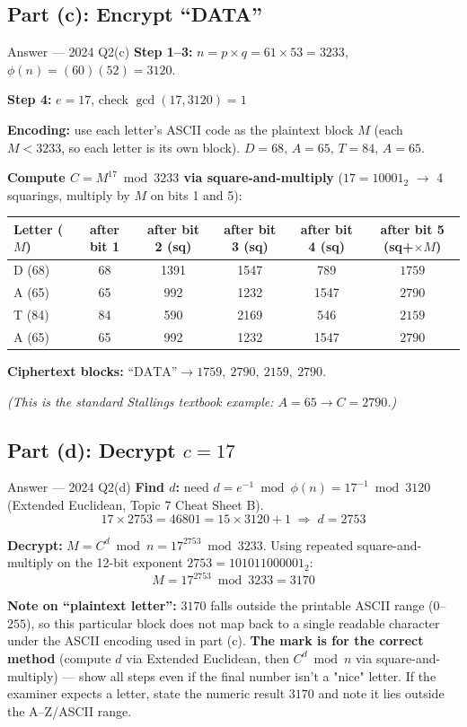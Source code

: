 \documentclass[12pt,a4paper]{article}
\begin{document}
\subsection{Part (c): Encrypt ``DATA''}
\begin{solbox}{Answer --- 2024 Q2(c)}
\textbf{Step 1--3:} $n = p\times q = 61\times53 = \boxed{3233}$, \quad $\phi(n)=(60)(52)=\boxed{3120}$.

\textbf{Step 4:} $e=17$, check $\gcd(17,3120)=1$ \checkmark

\textbf{Encoding:} use each letter's ASCII code as the plaintext block $M$ (each $M<3233$, so each letter is its own block). $D=68,\,A=65,\,T=84,\,A=65$.

\textbf{Compute $C=M^{17}\bmod 3233$ via square-and-multiply} ($17=10001_2$ $\to$ 4 squarings, multiply by $M$ on bits 1 and 5):

\renewcommand{\arraystretch}{1.2}
\begin{center}
\begin{tabular}{lccccc}
\toprule
Letter ($M$) & after bit 1 & after bit 2 (sq) & after bit 3 (sq) & after bit 4 (sq) & after bit 5 (sq+$\times M$) \\
\midrule
D (68) & 68 & 1391 & 1547 & 789 & $\boxed{1759}$ \\
A (65) & 65 & 992 & 1232 & 1547 & $\boxed{2790}$ \\
T (84) & 84 & 590 & 2169 & 546 & $\boxed{2159}$ \\
A (65) & 65 & 992 & 1232 & 1547 & $\boxed{2790}$ \\
\bottomrule
\end{tabular}
\end{center}

\textbf{Ciphertext blocks:} $\text{``DATA''} \to \boxed{1759,\ 2790,\ 2159,\ 2790}$.

\textit{(This is the standard Stallings textbook example: $A=65 \to C=2790$.)}
\end{solbox}

\subsection{Part (d): Decrypt $c=17$}
\begin{solbox}{Answer --- 2024 Q2(d)}
\textbf{Find $d$:} need $d = e^{-1}\bmod\phi(n) = 17^{-1}\bmod 3120$ (Extended Euclidean, Topic 7 Cheat Sheet B).
\[
17\times2753 = 46801 = 15\times3120 + 1 \;\Rightarrow\; d=\boxed{2753}
\]

\textbf{Decrypt:} $M = C^d \bmod n = 17^{2753}\bmod3233$. Using repeated square-and-multiply on the 12-bit exponent $2753=101011000001_2$:
\[
M = 17^{2753}\bmod 3233 = \boxed{3170}
\]

\textbf{Note on ``plaintext letter'':} $3170$ falls outside the printable ASCII range ($0$--$255$), so this particular block does not map back to a single readable character under the ASCII encoding used in part (c). \textbf{The mark is for the correct method} (compute $d$ via Extended Euclidean, then $C^d\bmod n$ via square-and-multiply) --- show all steps even if the final number isn't a "nice" letter. If the examiner expects a letter, state the numeric result $3170$ and note it lies outside the A--Z/ASCII range.
\end{solbox}
\end{document}
